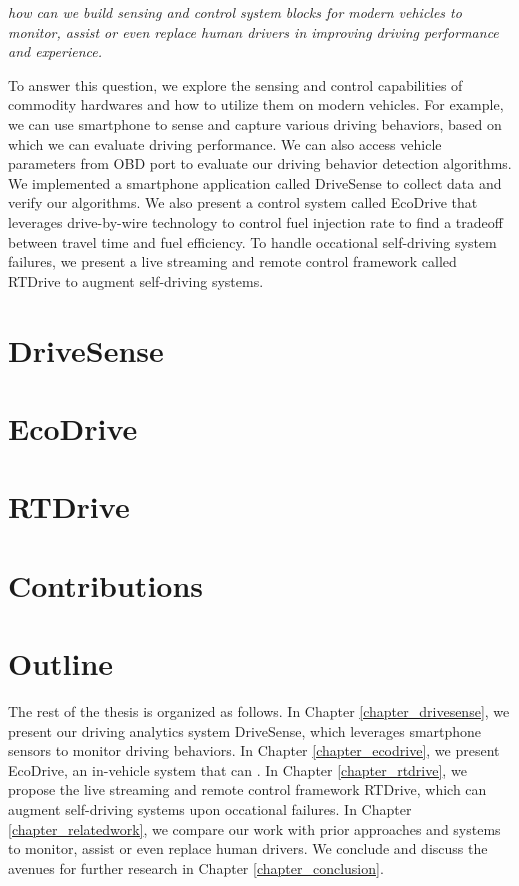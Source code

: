 \emph{how can we build sensing and control system blocks for modern vehicles to
monitor, assist or even replace human drivers in
improving driving performance and experience.}


To answer this question, we explore the sensing and control capabilities
of commodity hardwares and how to utilize them on modern vehicles. 
For example, we can use smartphone to sense and capture 
various driving behaviors, 
based on which we can evaluate driving performance. 
We can also access vehicle parameters from OBD 
port \cite{obd} to evaluate our driving behavior detection algorithms. 
We implemented a smartphone application called DriveSense to collect
data and verify our algorithms. 
We also present a control system called EcoDrive that 
leverages drive-by-wire technology to control fuel injection
rate to find a tradeoff between travel time and fuel efficiency. 
To handle occational self-driving system failures, 
we present a live streaming and remote control framework
called RTDrive to augment self-driving systems. 


\section{DriveSense}




\section{EcoDrive}




\section{RTDrive}



\section{Contributions}



\section{Outline}

The rest of the thesis is organized as follows. 
In Chapter \ref{chapter_drivesense}, we present
our driving analytics system DriveSense, which leverages smartphone
sensors to monitor driving behaviors.
In Chapter \ref{chapter_ecodrive}, we present EcoDrive, an in-vehicle
system that can . 
In Chapter \ref{chapter_rtdrive}, we propose the live streaming
and remote control framework RTDrive, which can augment
self-driving systems upon occational failures. 
In Chapter \ref{chapter_relatedwork}, we compare our work with prior
approaches and systems to monitor, assist or even replace human
drivers. 
We conclude and discuss the avenues for further research in Chapter \ref{chapter_conclusion}.



